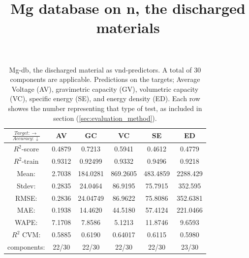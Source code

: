\begin{table}[h]
\normalsize
\centering
\caption{Mg-db, the discharged material as vnd-predictors. A total of 30 components are applicable. Predictions on the targets; Average Voltage (AV), gravimetric capacity (GV), volumetric capacity (VC), specific energy (SE), and energy density (ED). Each row showes the number representing that type of test, as included in section (\ref{sec:evaluation_method}).}
\title{Mg database on n, the discharged materials}
\begin{tabular}{|c|c|c|c|c|c|}
	\hline 
	$\frac{Target: \rightarrow}{Accuracy:\downarrow} $ & AV & GC & VC & SE & ED 
	 \\ 
	\hline
	$R^2$-score 	& 0.4879 & 0.7213 & 0.5941 & 0.4612 &  0.4779\\ 
	\hline 
	$R^2$-train 	& 0.9312 &  0.92499 & 0.9332 & 0.9496 & 0.9218 \\ 
	\hline
	Mean: 	 	&2.7038	&184.0281&869.2605&483.4859& 2288.429	\\
	\hline 
	Stdev:		&0.2835	&24.0464	& 86.9195	&75.7915& 352.595	\\
	\hline		
	RMSE: 		&0.2836& 24.04749 &  86.9622 & 75.8086 & 352.6381 \\ 
	\hline
	MAE: 		& 0.1938 & 14.4620& 44.5180 & 57.4124 & 221.0466 \\ 
	\hline
	WAPE: 		& 7.1708 & 7.8586 & 5.1213  & 11.8746 & 9.6593 \\
	\hline
	$R^2$ CVM: 	& 0.5885 & 0.6190 & 0.64017  & 0.6115 &  0.5980 \\
	\hline
	components: 	& 22/30 & 22/30 & 22/30  & 22/30 &23/30 \\
	\hline
\end{tabular}
\label{tab:mg-n-ii}
\end{table}


